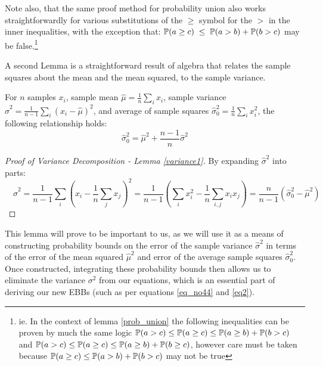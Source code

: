 Note also, that the same proof method for probability union also works straightforwardly for various substitutions of the $\ge$ symbol for the $>$ in the inner inequalities, with the exception that: $\operatorname{\mathbb{P}}(a\ge c) \; \le \; \operatorname{\mathbb{P}}(a>b) + \operatorname{\mathbb{P}}(b>c)$ may be false.\footnote{ie. In the context of lemma \ref{prob_union} the following inequalities can be proven by much the same logic $\operatorname{\mathbb{P}}(a>c)\le\operatorname{\mathbb{P}}(a\ge c)\le\operatorname{\mathbb{P}}(a\ge b)+\operatorname{\mathbb{P}}(b>c)$ and $\operatorname{\mathbb{P}}(a>c)\le\operatorname{\mathbb{P}}(a\ge c)\le\operatorname{\mathbb{P}}(a\ge b)+\operatorname{\mathbb{P}}(b\ge c)$, however care must be taken because $\operatorname{\mathbb{P}}(a\ge c)\le\operatorname{\mathbb{P}}(a>b)+\operatorname{\mathbb{P}}(b>c)$ may not be true}

A second Lemma is a straightforward result of algebra that relates the sample squares about the mean and the mean squared, to the sample variance.
\begin{lemma}\label{variance1}
For $n$ samples $x_i$, sample mean $\hat{\mu} = \frac{1}{n}\sum_ix_i$, sample variance $\hat{\sigma}^2=\frac{1}{n-1}\sum_i(x_i-\hat{\mu})^2$, and average of sample squares $\hat{\sigma}_0^2 = \frac{1}{n}\sum_ix_i^2$, the following relationship holds:
\[
\hat{\sigma}_0^2=\hat{\mu}^2+\frac{n-1}{n}\hat{\sigma}^2
\]
\end{lemma}
\begin{proof}[Proof of Variance Decomposition - Lemma \ref{variance1}]
By expanding $\hat{\sigma}^2$ into parts:\\
$$\quad\hat{\sigma}^2=\frac{1}{n-1}\sum_i\left(x_i-\frac{1}{n}\sum_jx_j \right)^2 
=\frac{1}{n-1}\left(\sum_ix_i^2-\frac{1}{n}\sum_{i,j}x_ix_j \right) = \frac{n}{n-1}\left(\hat{\sigma}_0^2-\hat{\mu}^2\right)$$
\end{proof}

This lemma will prove to be important to us, as we will use it as a means of constructing probability bounds on the error of the sample variance $\hat{\sigma}^2$ in terms of the error of the mean squared $\hat{\mu}^2$ and error of the average sample squares $\hat{\sigma}^2_0$.
Once constructed, integrating these probability bounds then allows us to eliminate the variance $\sigma^2$ from our equations, which is an essential part of deriving our new EBBs (such as per equations \ref{eq_no44} and \ref{eq2}).







